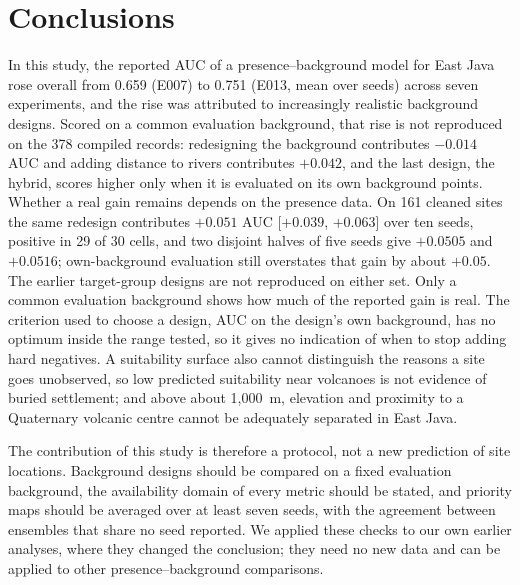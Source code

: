 \documentclass[12pt]{article}
\begin{document}
\section{Conclusions}

In this study, the reported AUC of a presence--background model for East Java rose overall from 0.659 (E007) to 0.751 (E013, mean over seeds) across seven experiments, and the rise was attributed to increasingly realistic background designs.
Scored on a common evaluation background, that rise is not reproduced on the 378 compiled records: redesigning the background contributes $-0.014$ AUC and adding distance to rivers contributes $+0.042$, and the last design, the hybrid, scores higher only when it is evaluated on its own background points.
Whether a real gain remains depends on the presence data. On 161 cleaned sites the same redesign contributes $+0.051$ AUC [$+0.039$, $+0.063$] over ten seeds, positive in 29 of 30 cells, and two disjoint halves of five seeds give $+0.0505$ and $+0.0516$; own-background evaluation still overstates that gain by about $+0.05$. The earlier target-group designs are not reproduced on either set.
Only a common evaluation background shows how much of the reported gain is real.
The criterion used to choose a design, AUC on the design's own background, has no optimum inside the range tested, so it gives no indication of when to stop adding hard negatives.
A suitability surface also cannot distinguish the reasons a site goes unobserved, so low predicted suitability near volcanoes is not evidence of buried settlement; and above about 1,000~m, elevation and proximity to a Quaternary volcanic centre cannot be adequately separated in East Java.

The contribution of this study is therefore a protocol, not a new prediction of site locations.
Background designs should be compared on a fixed evaluation background, the availability domain of every metric should be stated, and priority maps should be averaged over at least seven seeds, with the agreement between ensembles that share no seed reported.
We applied these checks to our own earlier analyses, where they changed the conclusion; they need no new data and can be applied to other presence--background comparisons.
\end{document}
